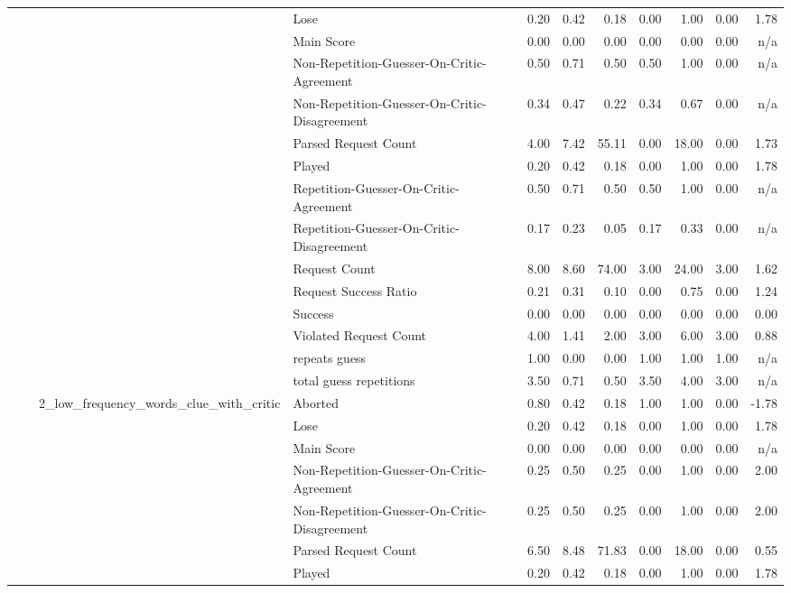 \begin{tabular}{llllrrrrrrr}
 &  &  & Lose & 0.20 & 0.42 & 0.18 & 0.00 & 1.00 & 0.00 & 1.78 \\
 &  &  & Main Score & 0.00 & 0.00 & 0.00 & 0.00 & 0.00 & 0.00 & n/a \\
 &  &  & Non-Repetition-Guesser-On-Critic-Agreement & 0.50 & 0.71 & 0.50 & 0.50 & 1.00 & 0.00 & n/a \\
 &  &  & Non-Repetition-Guesser-On-Critic-Disagreement & 0.34 & 0.47 & 0.22 & 0.34 & 0.67 & 0.00 & n/a \\
 &  &  & Parsed Request Count & 4.00 & 7.42 & 55.11 & 0.00 & 18.00 & 0.00 & 1.73 \\
 &  &  & Played & 0.20 & 0.42 & 0.18 & 0.00 & 1.00 & 0.00 & 1.78 \\
 &  &  & Repetition-Guesser-On-Critic-Agreement & 0.50 & 0.71 & 0.50 & 0.50 & 1.00 & 0.00 & n/a \\
 &  &  & Repetition-Guesser-On-Critic-Disagreement & 0.17 & 0.23 & 0.05 & 0.17 & 0.33 & 0.00 & n/a \\
 &  &  & Request Count & 8.00 & 8.60 & 74.00 & 3.00 & 24.00 & 3.00 & 1.62 \\
 &  &  & Request Success Ratio & 0.21 & 0.31 & 0.10 & 0.00 & 0.75 & 0.00 & 1.24 \\
 &  &  & Success & 0.00 & 0.00 & 0.00 & 0.00 & 0.00 & 0.00 & 0.00 \\
 &  &  & Violated Request Count & 4.00 & 1.41 & 2.00 & 3.00 & 6.00 & 3.00 & 0.88 \\
 &  &  & repeats guess & 1.00 & 0.00 & 0.00 & 1.00 & 1.00 & 1.00 & n/a \\
 &  &  & total guess repetitions & 3.50 & 0.71 & 0.50 & 3.50 & 4.00 & 3.00 & n/a \\
\cline{3-11}
 &  & \multirow[t]{15}{*}{2_low_frequency_words_clue_with_critic} & Aborted & 0.80 & 0.42 & 0.18 & 1.00 & 1.00 & 0.00 & -1.78 \\
 &  &  & Lose & 0.20 & 0.42 & 0.18 & 0.00 & 1.00 & 0.00 & 1.78 \\
 &  &  & Main Score & 0.00 & 0.00 & 0.00 & 0.00 & 0.00 & 0.00 & n/a \\
 &  &  & Non-Repetition-Guesser-On-Critic-Agreement & 0.25 & 0.50 & 0.25 & 0.00 & 1.00 & 0.00 & 2.00 \\
 &  &  & Non-Repetition-Guesser-On-Critic-Disagreement & 0.25 & 0.50 & 0.25 & 0.00 & 1.00 & 0.00 & 2.00 \\
 &  &  & Parsed Request Count & 6.50 & 8.48 & 71.83 & 0.00 & 18.00 & 0.00 & 0.55 \\
 &  &  & Played & 0.20 & 0.42 & 0.18 & 0.00 & 1.00 & 0.00 & 1.78 \\

\end{tabular}
